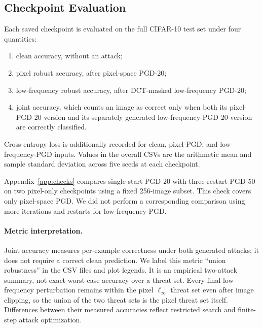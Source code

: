 \documentclass{article}
\newcommand{\linf}{\ell_\infty}
\begin{document}
\subsection{Checkpoint Evaluation}
Each saved checkpoint is evaluated on the full CIFAR-10 test set under four
quantities:
\begin{enumerate}
  \item clean accuracy, without an attack;
  \item pixel robust accuracy, after pixel-space PGD-20;
  \item low-frequency robust accuracy, after DCT-masked low-frequency PGD-20;
  \item joint accuracy, which counts an image as correct only when both its
  pixel-PGD-20 version and its separately generated low-frequency-PGD-20
  version are correctly classified.
\end{enumerate}
Cross-entropy loss is additionally recorded for clean, pixel-PGD, and
low-frequency-PGD inputs. Values in the overall CSVs are the arithmetic mean
and sample standard deviation across five seeds at each checkpoint.

Appendix~\ref{app:checks} compares single-start PGD-20 with three-restart PGD-50
on two pixel-only checkpoints using a fixed 256-image subset. This check
covers only pixel-space PGD. We did not perform a corresponding comparison
using more iterations and restarts for low-frequency PGD.

\paragraph{Metric interpretation.}
Joint accuracy measures per-example correctness under both generated
attacks; it does not require a correct clean prediction. We label this metric
``union robustness'' in the CSV files and plot legends. It is an empirical two-attack
summary, not exact worst-case accuracy over a threat set. Every final
low-frequency perturbation remains within the pixel $\linf$ threat set even
after image clipping, so the union of the two threat sets is the pixel threat
set itself. Differences between their measured accuracies reflect restricted
search and finite-step attack optimization.
\end{document}
